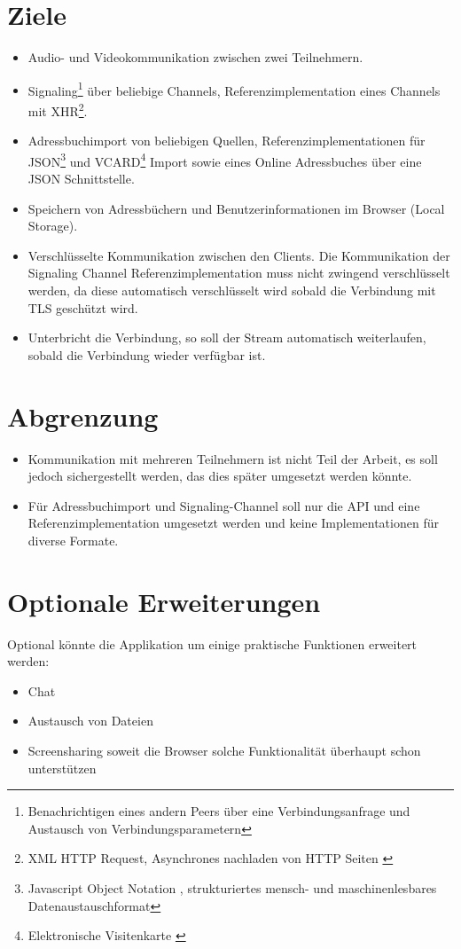 	\section{Ziele}
		\begin{itemize}
			\item Audio- und Videokommunikation zwischen zwei Teilnehmern.
			\item Signaling\footnote{Benachrichtigen eines andern Peers über eine Verbindungsanfrage und Austausch von Verbindungsparametern} 
				über beliebige Channels, Referenzimplementation eines Channels mit 
				XHR\footnote{XML HTTP Request, Asynchrones nachladen von HTTP Seiten \cite{MDN-XHR-Cross-Site}}.
			\item Adressbuchimport von beliebigen Quellen, Referenzimplementationen für 
				JSON\footnote{Javascript Object Notation \cite{IETF-JSON-RFC}, strukturiertes mensch- und maschinenlesbares Datenaustauschformat} und 
				VCARD\footnote{Elektronische Visitenkarte \cite{IETF-vCard-RFC}} Import sowie eines Online Adressbuches über eine JSON Schnittstelle.
			\item Speichern von Adressbüchern und Benutzerinformationen im Browser 
				(Local Storage\cite{MDN-LocalStorage}).
			\item Verschlüsselte Kommunikation zwischen den Clients. Die Kommunikation der Signaling Channel Referenzimplementation muss nicht zwingend verschlüsselt werden, da diese automatisch verschlüsselt wird sobald die Verbindung mit TLS geschützt wird.
			\item Unterbricht die Verbindung, so soll der Stream automatisch weiterlaufen, sobald die Verbindung wieder verfügbar ist.
		\end{itemize}
		
	\section{Abgrenzung}
		\begin{itemize}
			\item Kommunikation mit mehreren Teilnehmern ist nicht Teil der Arbeit, es soll jedoch sichergestellt werden, das dies später umgesetzt werden könnte.
			\item Für Adressbuchimport und Signaling-Channel soll nur die API und eine
			Referenzimplementation umgesetzt werden und keine Implementationen für diverse Formate.
		\end{itemize}
		
		
	\section{Optionale Erweiterungen}
		Optional könnte die Applikation um einige praktische Funktionen erweitert werden:		
		\begin{itemize}
			\item Chat
			\item Austausch von Dateien
			\item Screensharing soweit die Browser solche Funktionalität überhaupt schon unterstützen
		\end{itemize}
		
